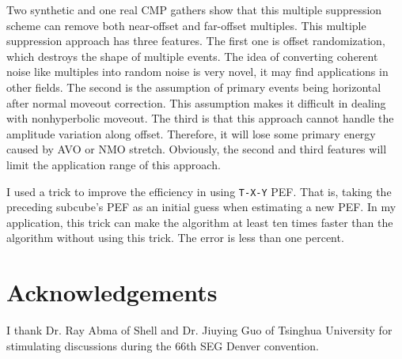 Two synthetic and one real CMP gathers show that this multiple 
suppression scheme can remove both near-offset and far-offset multiples. 
This multiple suppression approach has three features. The first 
one is offset randomization, which destroys the shape of multiple events. The 
idea of converting coherent noise like multiples into random noise is very 
novel, it may find applications in other fields. 
The second is the assumption of primary events being horizontal after normal 
moveout correction. This assumption makes it difficult in dealing with 
nonhyperbolic moveout. The third is that this approach cannot handle the 
amplitude variation along offset. Therefore, it will lose some primary energy 
caused by AVO or NMO stretch. Obviously, the second and third features 
will limit the application range of this approach. 

I used a trick to improve the efficiency in using {\tt T-X-Y} PEF. That is, 
taking the preceding subcube's PEF as an initial guess when estimating a new 
PEF. In my application, this trick can make the algorithm at least ten times 
faster than the algorithm without using this trick. The error is less than 
one percent. 

\section{Acknowledgements}

I thank Dr. Ray Abma of Shell and Dr. Jiuying Guo of Tsinghua University for 
stimulating discussions during the 66th SEG Denver convention.



